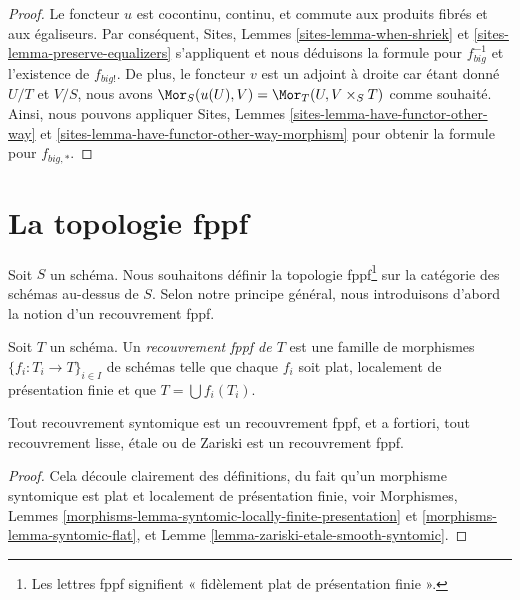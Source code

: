 \begin{proof}
Le foncteur $u$ est cocontinu, continu, et commute aux produits fibrés et aux égaliseurs. Par conséquent, Sites, Lemmes \ref{sites-lemma-when-shriek} et \ref{sites-lemma-preserve-equalizers} s'appliquent et nous déduisons la formule pour $f_{big}^{-1}$ et l'existence de $f_{big!}$. De plus, le foncteur $v$ est un adjoint à droite car étant donné $U/T$ et $V/S$, nous avons $\Mor_S(u(U), V) = \Mor_T(U, V \times_S T)$ comme souhaité. Ainsi, nous pouvons appliquer Sites, Lemmes \ref{sites-lemma-have-functor-other-way} et \ref{sites-lemma-have-functor-other-way-morphism} pour obtenir la formule pour $f_{big, *}$.
\end{proof}













\section{La topologie fppf}
\label{section-fppf}

\noindent
Soit $S$ un schéma. Nous souhaitons définir la topologie fppf\footnote{Les lettres fppf signifient « fidèlement plat de présentation finie ».} sur la catégorie des schémas au-dessus de $S$. Selon notre principe général, nous introduisons d'abord la notion d'un recouvrement fppf.

\begin{definition}
\label{definition-fppf-covering}
Soit $T$ un schéma. Un {\it recouvrement fppf de $T$} est une famille de morphismes $\{f_i : T_i \to T\}_{i \in I}$ de schémas telle que chaque $f_i$ soit plat, localement de présentation finie et que $T = \bigcup f_i(T_i)$.
\end{definition}

\begin{lemma}
\label{lemma-zariski-etale-smooth-syntomic-fppf}
Tout recouvrement syntomique est un recouvrement fppf, et a fortiori, tout recouvrement lisse, étale ou de Zariski est un recouvrement fppf.
\end{lemma}

\begin{proof}
Cela découle clairement des définitions, du fait qu'un morphisme syntomique est plat et localement de présentation finie, voir Morphismes, Lemmes \ref{morphisms-lemma-syntomic-locally-finite-presentation} et \ref{morphisms-lemma-syntomic-flat}, et Lemme \ref{lemma-zariski-etale-smooth-syntomic}.
\end{proof}


